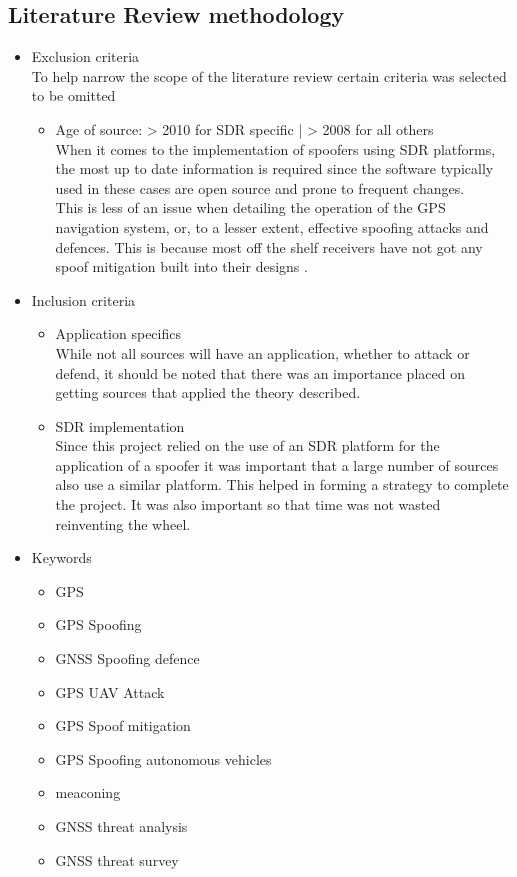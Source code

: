 
\subsection{Literature Review methodology}
\begin{itemize}
    \item Exclusion criteria \\ To help narrow the scope of the literature review certain criteria was selected to be omitted
    \begin{itemize}
        \item Age of source: > 2010 for SDR specific | > 2008 for all others \\ When it comes to the implementation of spoofers using SDR platforms, the most up to date information is required since the software typically used in these cases are open source and prone to frequent changes.\\ This is less of an issue when detailing the operation of the GPS navigation system, or, to a lesser extent, effective spoofing attacks and defences. This is because most off the shelf receivers have not got any spoof mitigation built into their designs \cite{RN12}.
    \end{itemize}
    \item Inclusion criteria
    \begin{itemize}
        \item Application specifics \\ While not all sources will have an application, whether to attack or defend, it should be noted that there was an importance placed on getting sources that applied the theory described.
        \item SDR implementation \\ Since this project relied on the use of an SDR platform for the application of a spoofer it was important that a large number of sources also use a similar platform. This helped in forming a strategy to complete the project. It was also important so that time was not wasted reinventing the wheel.
    \end{itemize}
    \item Keywords
    \begin{itemize}
        \item GPS
        \item GPS Spoofing
        \item GNSS Spoofing defence
        \item GPS UAV Attack
        \item GPS Spoof mitigation
        \item GPS Spoofing autonomous vehicles
        \item meaconing
        \item GNSS threat analysis
        \item GNSS threat survey
    \end{itemize}
\end{itemize}

